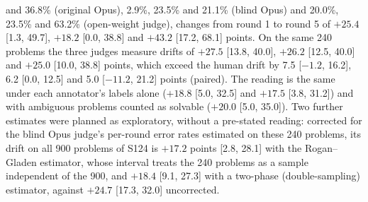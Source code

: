 \documentclass[10pt,a4paper]{article}
\begin{document}
and 36.8\% (original Opus), 2.9\%, 23.5\% and 21.1\% (blind Opus) and 20.0\%, 23.5\% and 63.2\% (open-weight judge), changes from round 1 to round 5 of $+25.4$ [1.3, 49.7], $+18.2$ [0.0, 38.8] and $+43.2$ [17.2, 68.1] points. On the same 240 problems the three judges measure drifts of $+27.5$ [13.8, 40.0], $+26.2$ [12.5, 40.0] and $+25.0$ [10.0, 38.8] points, which exceed the human drift by 7.5 [$-1.2$, 16.2], 6.2 [0.0, 12.5] and 5.0 [$-11.2$, 21.2] points (paired). The reading is the same under each annotator's labels alone ($+18.8$ [5.0, 32.5] and $+17.5$ [3.8, 31.2]) and with ambiguous problems counted as solvable ($+20.0$ [5.0, 35.0]). Two further estimates were planned as exploratory, without a pre-stated reading: corrected for the blind Opus judge's per-round error rates estimated on these 240 problems, its drift on all 900 problems of S124 is $+17.2$ points [2.8, 28.1] with the Rogan--Gladen estimator, whose interval treats the 240 problems as a sample independent of the 900, and $+18.4$ [9.1, 27.3] with a two-phase (double-sampling) estimator, against $+24.7$ [17.3, 32.0] uncorrected.
\end{document}
